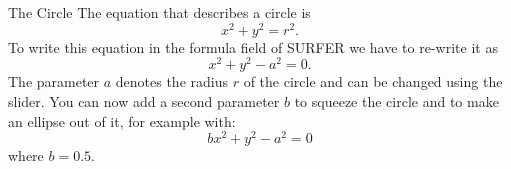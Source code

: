 \begin{surferPage}[Circle]{The Circle}
The equation that describes a circle is
\[x^2+y^2=r^2.\]
To write this equation in the formula field of SURFER we have to re-write it as
\[x^2+y^2-a^2=0.\]
The parameter $a$ denotes the radius $r$ of the circle and can be changed using the slider. You can now add a second parameter $b$ to squeeze the circle and to make an ellipse out of it, for example with:
\[bx^2+y^2-a^2=0\] where $b=0.5$.
\end{surferPage}
